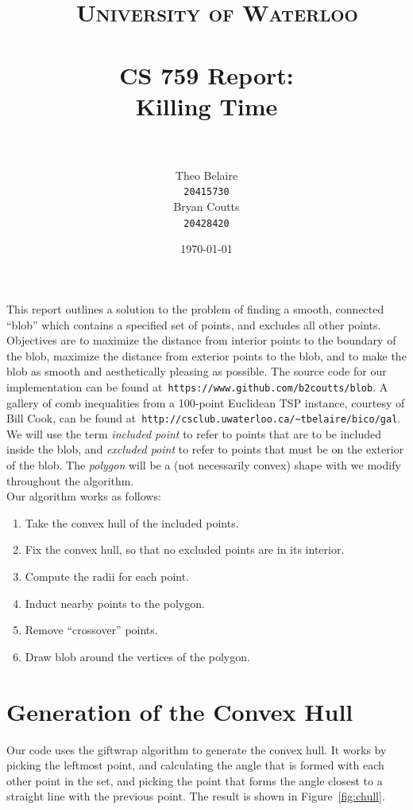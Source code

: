 \documentclass[paper=a4, fontsize=11pt]{scrartcl} %
\title{\
    \normalfont\normalsize
    \textsc{University of Waterloo} \\ [25pt] %
    \horrule{0.5pt} \\[0.4cm] %
    \huge CS 759 Report:\\
    Killing Time \\
    \horrule{2pt} \\[0.5cm] %
}
\author{Theo Belaire \\ \texttt{20415730} \\ Bryan Coutts \\ \texttt{20428420}} %
\date{\normalsize\today} %
\numberwithin{equation}{section} %
\numberwithin{figure}{section} %
\numberwithin{table}{section} %
\begin{document}
\maketitle %

This report outlines a solution to the problem of finding a smooth, connected
``blob'' which contains a specified set of points, and excludes all other
points. Objectives are to maximize the distance from interior points to the
boundary of the blob, maximize the distance from exterior points to the blob,
and to make the blob as smooth and aesthetically pleasing as possible. The
source code for our implementation can be found at\,
\verb|https://www.github.com/b2coutts/blob|. A gallery of comb inequalities from
a 100-point Euclidean TSP instance, courtesy of Bill Cook, can be found at\,
\verb|http://csclub.uwaterloo.ca/~tbelaire/bico/gal|. \\

We will use the term \textit{included point} to refer to points that are to be
included inside the blob, and \textit{excluded point} to refer to points that
must be on the exterior of the blob. The \textit{polygon} will be a (not
necessarily convex) shape with we modify throughout the algorithm. \\

Our algorithm works as follows:
\begin{enumerate}
\item Take the convex hull of the included points.
\item Fix the convex hull, so that no excluded points are in its interior.
\item Compute the radii for each point.
\item Induct nearby points to the polygon. 
\item Remove ``crossover'' points.
\item Draw blob around the vertices of the polygon.
\end{enumerate}


\section{Generation of the Convex Hull}
Our code uses the giftwrap algorithm to generate the convex hull.  It works by
picking the leftmost point, and calculating the angle that is formed with each
other point in the set, and picking the point that forms the angle closest to a
straight line with the previous point. The result is shown in
Figure~\ref{fig:chull}. \\
\end{document}
